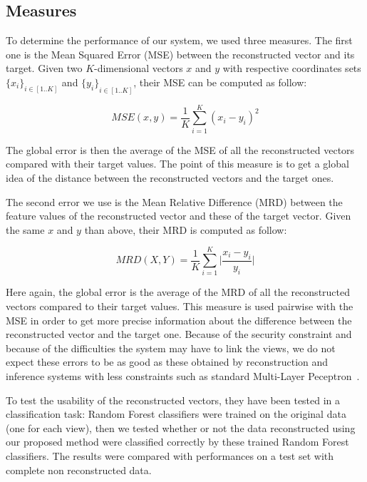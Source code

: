 	\subsection{Measures}
\label{sec:measures}
To determine the performance of our system, we used three measures. The first one is the Mean Squared Error (MSE) between the reconstructed vector and its target. Given two $K$-dimensional vectors $x$ and $y$ with respective coordinates sets ${\{x_i\}}_{i \in [1..K]}$ and ${\{y_i\}}_{i \in [1..K]}$, their MSE can be computed as follow:
	
	\begin{equation}
        MSE(x, y) = \frac{1}{K}\sum_{i = 1}^{K}{(x_i - y_i)}^2
	\end{equation}

The global error is then the average of the MSE of all the reconstructed vectors compared with their target values. The point of this measure is to get a global idea of the distance between the reconstructed vectors and the target ones.
	
The second error we use is the Mean Relative Difference (MRD) between the feature values of the reconstructed vector and these of the target vector. Given the same $x$ and $y$ than above, their MRD is computed as follow: 

	\begin{equation}
		MRD(X, Y) = \frac{1}{K}\sum_{i=1}^{K}\Big|\frac{x_i - y_i}{y_i}\Big|
	\end{equation}
	
Here again, the global error is the average of the MRD of all the reconstructed vectors compared to their target values. This measure is used pairwise with the MSE in order to get more precise information about the difference between the reconstructed vector and the target one. Because of the security constraint and because of the difficulties the system may have to link the views, we do not expect these errors to be as good as these obtained by reconstruction and inference systems with less constraints such as standard Multi-Layer Peceptron~\cite{vincent2010stacked}.
	
To test the usability of the reconstructed vectors, they have been tested in a classification task: Random Forest classifiers were trained on the original data (one for each view), then we tested whether or not the data reconstructed using our proposed method were classified correctly by these trained Random Forest classifiers. The results were compared with performances on a test set with complete non reconstructed data.
	
